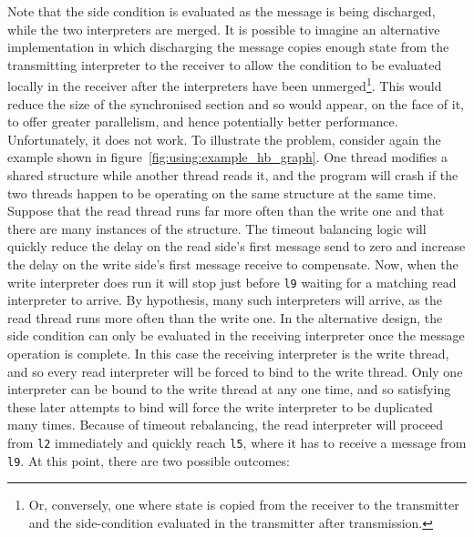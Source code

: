 Note that the side condition is evaluated as the message is being
discharged, while the two interpreters are merged.   It is possible to imagine an alternative implementation
in which discharging the message copies enough state from the
transmitting interpreter to the receiver to allow the condition to be
evaluated locally in the receiver after the interpreters have been
unmerged\footnote{Or, conversely, one where state is copied from the
  receiver to the transmitter and the side-condition evaluated in the
  transmitter after transmission.}.  This would reduce the size of the
synchronised section and so would appear, on the face of it, to offer
greater parallelism, and hence potentially better performance.
Unfortunately, it does not work.  To illustrate the problem, consider
again the example shown in figure~\ref{fig:using:example_hb_graph}.
One thread modifies a shared structure while another thread reads it,
and the program will crash if the two threads happen to be operating
on the same structure at the same time.  Suppose that the read thread
runs far more often than the write one and that there are many
instances of the structure.  The timeout balancing logic will quickly
reduce the delay on the read side's first message send to zero and
increase the delay on the write side's first message receive to
compensate.  Now, when the write interpreter does run it will stop
just before \verb|l9| waiting for a matching read interpreter to
arrive.  By hypothesis, many such interpreters will arrive, as the
read thread runs more often than the write one.  In the alternative
design, the side condition can only be evaluated in the receiving
interpreter once the message operation is complete.  In this case the
receiving interpreter is the write thread, and so every read
interpreter will be forced to bind to the write thread.  Only one
interpreter can be bound to the write thread at any one time, and so
satisfying these later attempts to bind will force the write
interpreter to be duplicated many times.  Because of timeout
rebalancing, the read interpreter will proceed from \verb|l2|
immediately and quickly reach \verb|l5|, where it has to receive a
message from \verb|l9|.  At this point, there are two possible
outcomes:

